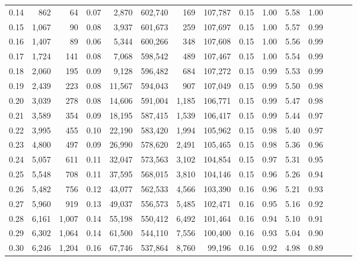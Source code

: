 \begin{tabular}{rrrrrrrrrrrrrrr}
0.14 &      862 &      64 &  0.07 &    2,870 &  602,740 &      169 &  107,787 &  0.15 &  1.00 &  5.58 &      1.00 \\
0.15 &    1,067 &      90 &  0.08 &    3,937 &  601,673 &      259 &  107,697 &  0.15 &  1.00 &  5.57 &      0.99 \\
0.16 &    1,407 &      89 &  0.06 &    5,344 &  600,266 &      348 &  107,608 &  0.15 &  1.00 &  5.56 &      0.99 \\
0.17 &    1,724 &     141 &  0.08 &    7,068 &  598,542 &      489 &  107,467 &  0.15 &  1.00 &  5.54 &      0.99 \\
0.18 &    2,060 &     195 &  0.09 &    9,128 &  596,482 &      684 &  107,272 &  0.15 &  0.99 &  5.53 &      0.99 \\
0.19 &    2,439 &     223 &  0.08 &   11,567 &  594,043 &      907 &  107,049 &  0.15 &  0.99 &  5.50 &      0.98 \\
0.20 &    3,039 &     278 &  0.08 &   14,606 &  591,004 &    1,185 &  106,771 &  0.15 &  0.99 &  5.47 &      0.98 \\
0.21 &    3,589 &     354 &  0.09 &   18,195 &  587,415 &    1,539 &  106,417 &  0.15 &  0.99 &  5.44 &      0.97 \\
0.22 &    3,995 &     455 &  0.10 &   22,190 &  583,420 &    1,994 &  105,962 &  0.15 &  0.98 &  5.40 &      0.97 \\
0.23 &    4,800 &     497 &  0.09 &   26,990 &  578,620 &    2,491 &  105,465 &  0.15 &  0.98 &  5.36 &      0.96 \\
0.24 &    5,057 &     611 &  0.11 &   32,047 &  573,563 &    3,102 &  104,854 &  0.15 &  0.97 &  5.31 &      0.95 \\
0.25 &    5,548 &     708 &  0.11 &   37,595 &  568,015 &    3,810 &  104,146 &  0.15 &  0.96 &  5.26 &      0.94 \\
0.26 &    5,482 &     756 &  0.12 &   43,077 &  562,533 &    4,566 &  103,390 &  0.16 &  0.96 &  5.21 &      0.93 \\
0.27 &    5,960 &     919 &  0.13 &   49,037 &  556,573 &    5,485 &  102,471 &  0.16 &  0.95 &  5.16 &      0.92 \\
0.28 &    6,161 &   1,007 &  0.14 &   55,198 &  550,412 &    6,492 &  101,464 &  0.16 &  0.94 &  5.10 &      0.91 \\
0.29 &    6,302 &   1,064 &  0.14 &   61,500 &  544,110 &    7,556 &  100,400 &  0.16 &  0.93 &  5.04 &      0.90 \\
0.30 &    6,246 &   1,204 &  0.16 &   67,746 &  537,864 &    8,760 &   99,196 &  0.16 &  0.92 &  4.98 &      0.89 \\

\end{tabular}
